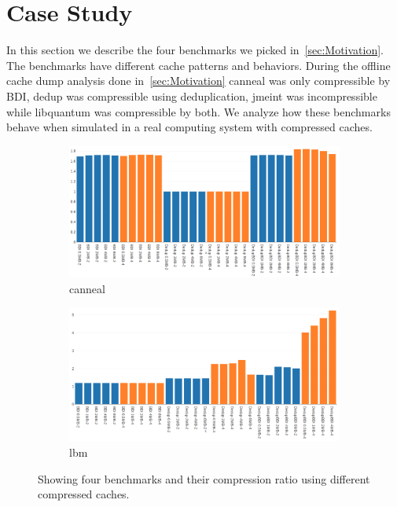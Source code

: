 \section{Case Study}
\label{sec:case_study}
In this section we describe the four benchmarks we picked in~\ref{sec:Motivation}. The benchmarks have different cache patterns and behaviors. During the offline cache dump analysis done in~\ref{sec:Motivation} canneal was only compressible by BDI, dedup was compressible using deduplication, jmeint was incompressible while libquantum was compressible by both. We analyze how these benchmarks behave when simulated in a real computing system with compressed caches.\par
\begin{figure}
    \begin{subfigure}{\textwidth}
        \includegraphics[width=\textwidth]{canneal-compratio.png}
        \caption{canneal}
    \end{subfigure}
    \begin{subfigure}{\textwidth}
        \includegraphics[width=\textwidth]{lbm-compratio.png}
        \caption{lbm}
    \end{subfigure}
    \caption[Case Study: Compression1]{Showing four benchmarks and their compression ratio using different compressed caches.}
    \label{fig:case_compratio1}
\end{figure}
